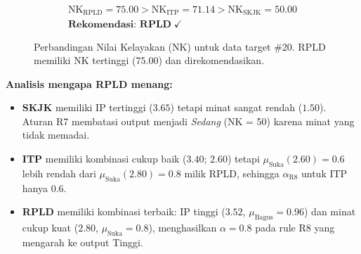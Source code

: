 \documentclass[conference]{IEEEtran}
\begin{document}
\begin{gather*}
  \text{NK}_{\text{RPLD}} = 75.00 > \text{NK}_{\text{ITP}} = 71.14 > \text{NK}_{\text{SKJK}} = 50.00 \\[4pt]
  \boxed{\textbf{Rekomendasi: RPLD} \;\checkmark}
\end{gather*}

\begin{figure}[htbp]
\centering
{}
\caption{Perbandingan Nilai Kelayakan (NK) untuk data target \#20.
RPLD memiliki NK tertinggi ($75.00$) dan direkomendasikan.}
\label{fig:bar-nk}
\end{figure}

\vspace{0.5em}
\noindent\textbf{Analisis mengapa RPLD menang:}
\begin{itemize}[nosep,leftmargin=*]
  \item \textbf{SKJK} memiliki IP tertinggi ($3.65$) tetapi minat
        sangat rendah ($1.50$). Aturan R7 membatasi output menjadi
        \emph{Sedang} (NK = 50) karena minat yang tidak memadai.
  \item \textbf{ITP} memiliki kombinasi cukup baik ($3.40$; $2.60$)
        tetapi $\mu_{\text{Suka}}(2.60) = 0.6$ lebih rendah dari
        $\mu_{\text{Suka}}(2.80) = 0.8$ milik RPLD, sehingga
        $\alpha_{\text{R8}}$ untuk ITP hanya 0.6.
  \item \textbf{RPLD} memiliki kombinasi terbaik: IP tinggi ($3.52$,
        $\mu_{\text{Bagus}}=0.96$) dan minat cukup kuat ($2.80$,
        $\mu_{\text{Suka}}=0.8$), menghasilkan $\alpha=0.8$ pada
        rule R8 yang mengarah ke output Tinggi.
\end{itemize}
\end{document}
